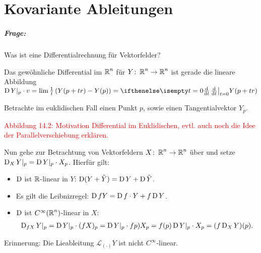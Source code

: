 
\chapter{Kovariante Ableitungen}

\paragraph{Frage:} Was ist eine  Differentialrechnung für Vektorfelder?

Das gewöhnliche Differential im $\operatorname{\mathbb{R}}^n$ für $Y \colon \operatorname{\mathbb{R}}^n \to \operatorname{\mathbb{R}}^n$ ist gerade die lineare Abbildung $\D Y|_p \cdot v = \lim \frac{1}t \left(Y(p+tr) -Y(p)\right) = \difffrac[t=0]{}{t} Y(p+tr)$

Betrachte im euklidischen Fall einen Punkt $p$, sowie einen Tangentialvektor $Y_p$.

\textcolor{red}{Abbildung 14.2: Motivation Differential im Euklidischen, evtl. auch noch die Idee der Parallelverschiebung erklären.}

Nun gehe zur Betrachtung von Vektorfeldern $X \colon \operatorname{\mathbb{R}}^n \to \operatorname{\mathbb{R}}^n$ über und setze $\operatorname{D}_XY|_p = \operatorname{D} Y|_p\cdot X_p$. Hierfür gilt:
\begin{itemize}
\item $\operatorname{D}$ ist $\operatorname{\mathbb{R}}$-linear in $Y$: $\operatorname{D}(Y + \tilde Y) = \operatorname{D} Y + \operatorname{D} \tilde Y$.
\item Es gilt die Leibnizregel: $\operatorname{D} fY = \operatorname{D} f \cdot Y + f\operatorname{D} Y$.
\item $\operatorname{D}$ ist $C^{\infty}(\operatorname{\mathbb{R}}^n)$-linear in $X$:
  \begin{align*}
    \operatorname{D}_{fX}Y|_p = \operatorname{D} Y|_p\cdot(fX)_p = \operatorname{D} Y|_p \cdot fp)X_p = f(p) \operatorname{D} Y|_p \cdot X_p = (f \operatorname{D}_XY)(p).
  \end{align*}
\end{itemize}

Erinnerung: Die Lieableitung $\mathcal L_{(\cdot)}Y$ ist nicht $C^{\infty}$-linear.

